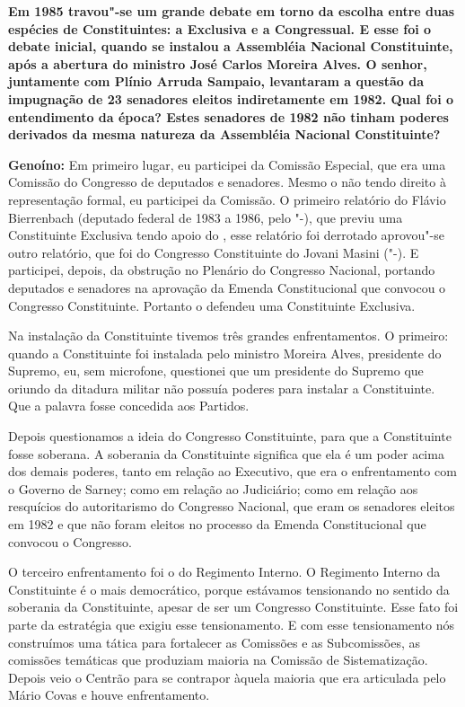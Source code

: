 \textbf{Em 1985 travou"-se um grande debate em torno da escolha entre
duas espécies de Constituintes: a Exclusiva e a Congressual. E esse foi
o debate inicial, quando se instalou a Assembléia Nacional Constituinte,
após a abertura do ministro José Carlos Moreira Alves. O senhor,
juntamente com Plínio Arruda Sampaio, levantaram a questão da impugnação
de 23 senadores eleitos indiretamente em 1982. Qual foi o entendimento
da época? Estes senadores de 1982 não tinham poderes derivados da mesma
natureza da Assembléia Nacional Constituinte?}

\textbf{Genoíno:} Em primeiro lugar, eu participei da Comissão Especial,
que era uma Comissão do Congresso de deputados e senadores. Mesmo o 
não tendo direito à representação formal, eu participei da Comissão. O
primeiro relatório do Flávio Bierrenbach (deputado federal de 1983 a
1986, pelo "-), que previu uma Constituinte Exclusiva tendo apoio
do , esse relatório foi derrotado aprovou"-se outro relatório, que foi
do Congresso Constituinte do Jovani Masini ("-). E participei,
depois, da obstrução no Plenário do Congresso Nacional, portando
deputados e senadores na aprovação da Emenda Constitucional que convocou
o Congresso Constituinte. Portanto o  defendeu uma Constituinte
Exclusiva.

Na instalação da Constituinte tivemos três grandes enfrentamentos. O
primeiro: quando a Constituinte foi instalada pelo ministro Moreira
Alves, presidente do Supremo, eu, sem microfone, questionei que um
presidente do Supremo que oriundo da ditadura militar não possuía
poderes para instalar a Constituinte. Que a palavra fosse concedida aos
Partidos.

Depois questionamos a ideia do Congresso Constituinte, para que a
Constituinte fosse soberana. A soberania da Constituinte significa que
ela é um poder acima dos demais poderes, tanto em relação ao Executivo,
que era o enfrentamento com o Governo de Sarney; como em relação ao
Judiciário; como em relação aos resquícios do autoritarismo do Congresso
Nacional, que eram os senadores eleitos em 1982 e que não foram eleitos
no processo da Emenda Constitucional que convocou o Congresso.

O terceiro enfrentamento foi o do Regimento Interno. O Regimento Interno
da Constituinte é o mais democrático, porque estávamos tensionando no
sentido da soberania da Constituinte, apesar de ser um Congresso
Constituinte. Esse fato foi parte da estratégia que exigiu esse
tensionamento. E com esse tensionamento nós construímos uma tática para
fortalecer as Comissões e as Subcomissões, as comissões temáticas que
produziam maioria na Comissão de Sistematização. Depois veio o Centrão
para se contrapor àquela maioria que era articulada pelo Mário Covas e
houve enfrentamento.

